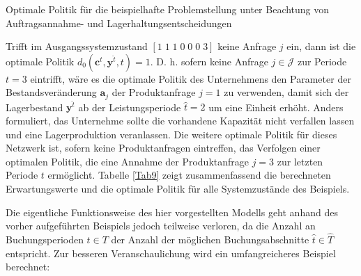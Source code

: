 \begin{table}
\begin{footnotesize}
     \caption{Optimale Politik für die beispielhafte Problemstellung unter Beachtung von Auftragsannahme- und Lagerhaltungsentscheidungen} \label{Tab9}
    \vspace*{3mm}
        \begin{center}
      \end{center}
    \begin{center}
      \end{center}
\end{footnotesize}
\end{table}

Trifft im Ausgangssystemzustand $[1\;1\;1\;0\;0\;0\;3]$ keine Anfrage $j$ ein, dann ist die optimale Politik $d_{0}({\textbf{c}^{\hat t},\textbf{y}^{\hat t}, t})=1$. D. h. sofern keine Anfrage $j\in\mathcal{J}$ zur Periode $t=3$ eintrifft, wäre es die optimale Politik des Unternehmens den Parameter der Bestandsveränderung $\textbf{a}_j$ der Produktanfrage $j=1$ zu verwenden, damit sich der Lagerbestand $\textbf{y}^{\hat t}$ ab der Leistungsperiode $\hat{t}=2$ um eine Einheit erhöht. Anders formuliert, das Unternehme sollte die vorhandene Kapazität nicht verfallen lassen und eine Lagerproduktion veranlassen. Die weitere optimale Politik für dieses Netzwerk ist, sofern keine Produktanfragen eintreffen, das Verfolgen einer optimalen Politik, die eine Annahme der Produktanfrage $j=3$ zur letzten Periode $t$ ermöglicht. Tabelle \ref{Tab9} zeigt zusammenfassend die berechneten Erwartungswerte und die optimale Politik für alle Systemzustände des Beispiels.

Die eigentliche Funktionsweise des hier vorgestellten Modells geht anhand des vorher aufgeführten Beispiels jedoch teilweise verloren, da die Anzahl an Buchungsperioden $t\in T$ der Anzahl der möglichen Buchungsabschnitte $\hat{t}\in\hat{T}$ entspricht. Zur besseren Veranschaulichung wird ein umfangreicheres Beispiel berechnet:

